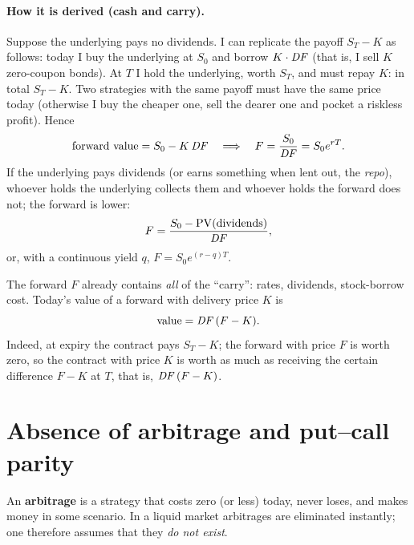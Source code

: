 \paragraph{How it is derived (cash and carry).} Suppose the underlying pays no dividends. I can replicate the payoff
$S_T-K$ as follows: today I buy the underlying at $S_0$ and borrow $K\cdot\mathit{DF}$ (that is, I sell $K$ zero-coupon
bonds). At $T$ I hold the underlying, worth $S_T$, and must repay $K$: in total $S_T-K$. Two strategies with the same
payoff must have the same price today (otherwise I buy the cheaper one, sell the dearer one and pocket a riskless
profit). Hence
\begin{equation}
\text{forward value} = S_0-K\,\mathit{DF} \quad\Longrightarrow\quad F=\frac{S_0}{\mathit{DF}}=S_0e^{rT}.
\end{equation}
If the underlying pays dividends (or earns something when lent out, the \emph{repo}), whoever holds the underlying
collects them and whoever holds the forward does not; the forward is lower:
\begin{equation}\label{eq:forward-dividendi}
F=\frac{S_0-\mathrm{PV}(\text{dividends})}{\mathit{DF}},
\end{equation}
or, with a continuous yield $q$, $F=S_0e^{(r-q)T}$.

\begin{idea}
The forward $F$ already contains \emph{all} of the ``carry'': rates, dividends, stock-borrow cost. Today's value of a
forward with delivery price $K$ is
\begin{equation}\label{eq:valore-forward}
\text{value} = \mathit{DF}\,(F-K).
\end{equation}
Indeed, at expiry the contract pays $S_T-K$; the forward with price $F$ is worth zero, so the contract with price $K$
is worth as much as receiving the certain difference $F-K$ at $T$, that is, $\mathit{DF}\,(F-K)$.
\end{idea}

\section{Absence of arbitrage and put--call parity}

\begin{definizione}[Arbitrage]
An \textbf{arbitrage} is a strategy that costs zero (or less) today, never loses, and makes money in some scenario.
In a liquid market arbitrages are eliminated instantly; one therefore assumes that they \emph{do not exist}.
\end{definizione}

